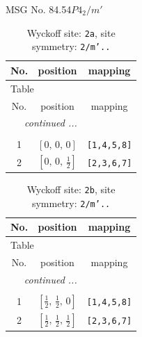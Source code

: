 \documentclass[fleqn,8pt]{jsarticle}
\begin{document}
\setcounter{MaxMatrixCols}{32}

\renewcommand{\tablename}{Table~}
\renewcommand{\figurename}{Figure~}
\begin{center}
\LARGE
MSG No. 84.54\quad$P4_{2}/m'$
\end{center}
\renewcommand{\arraystretch}{1.2}
\begin{longtable}{ccc}
\caption{Wyckoff site: {\tt 2a}, site symmetry: {\tt 2/m'..}}
 \\
 \hline \hline
No. & position & mapping \\ \hline \endfirsthead

\multicolumn{2}{l}{\tablename\ \thetable{}} \\
 \hline \hline
No. & position & mapping \\ \hline \endhead

 \hline \hline
\multicolumn{2}{r}{\footnotesize\it continued ...} \\ \endfoot

 \hline \hline
\multicolumn{2}{r}{} \\ \endlastfoot

1 & $\left[ 0,\, 0,\, 0 \right]$ & {\tt [1,4,5,8]} \\ \hline
2 & $\left[ 0,\, 0,\, \frac{1}{2} \right]$ & {\tt [2,3,6,7]} \\
\end{longtable}
\renewcommand{\arraystretch}{1.2}
\begin{longtable}{ccc}
\caption{Wyckoff site: {\tt 2b}, site symmetry: {\tt 2/m'..}}
 \\
 \hline \hline
No. & position & mapping \\ \hline \endfirsthead

\multicolumn{2}{l}{\tablename\ \thetable{}} \\
 \hline \hline
No. & position & mapping \\ \hline \endhead

 \hline \hline
\multicolumn{2}{r}{\footnotesize\it continued ...} \\ \endfoot

 \hline \hline
\multicolumn{2}{r}{} \\ \endlastfoot

1 & $\left[ \frac{1}{2},\, \frac{1}{2},\, 0 \right]$ & {\tt [1,4,5,8]} \\ \hline
2 & $\left[ \frac{1}{2},\, \frac{1}{2},\, \frac{1}{2} \right]$ & {\tt [2,3,6,7]} \\
\end{longtable}
\end{document}
